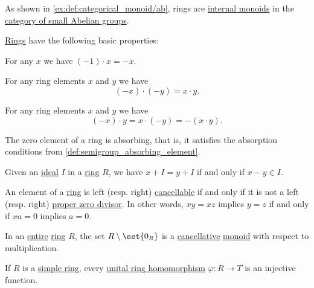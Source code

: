 \begin{comments}
  \item As shown in \cref{ex:def:categorical_monoid/ab}, rings are \hyperref[def:categorical_monoid]{internal monoids} in the \hyperref[def:abelian_group]{category of small Abelian groups}.
\end{comments}

\begin{proposition}\label{thm:def:ring}
  \hyperref[def:ring]{Rings} have the following basic properties:
  \begin{thmenum}
     For any \( x \) we have \( (-1) \cdot x = -x \).

     For any ring elements \( x \) and \( y \) we have
    \begin{equation}\label{eq:thm:def:ring/multiplication_even_sign}
      (-x) \cdot (-y) = x \cdot y.
    \end{equation}

     For any ring elements \( x \) and \( y \) we have
    \begin{equation}\label{eq:thm:def:ring/multiplication_odd_sign}
      (-x) \cdot y = x \cdot (-y) = -(x \cdot y).
    \end{equation}

     The zero element of a ring is absorbing, that is, it satisfies the absorption conditions from \cref{def:semigroup_absorbing_element}.

     Given an \hyperref[def:semiring_ideal]{ideal} \( I \) in a \hyperref[def:ring]{ring} \( R \), we have \( x + I = y + I \) if and only if \( x - y \in I \).

     An element of a \hyperref[def:ring]{ring} is left (resp. right) \hyperref[def:binary_operation/cancellative]{cancellable} if and only if it is not a left (resp. right) \hyperref[def:semiring_divisibility/zero]{proper zero divisor}. In other words, \( xy = xz \) implies \( y = z \) if and only if \( xa = 0 \) implies \( a = 0 \).

     In an \hyperref[def:entire_semiring]{entire} \hyperref[def:ring]{ring} \( R \), the set \( R \setminus \set{ 0_R } \) is a \hyperref[def:binary_operation/cancellative]{cancellative} \hyperref[def:monoid]{monoid} with respect to multiplication.

     If \( R \) is a \hyperref[def:ring/simple]{simple ring}, every \hyperref[def:ring/morphism]{unital ring homomorphism} \( \varphi: R \to T \) is an injective function.
  \end{thmenum}
\end{proposition}
